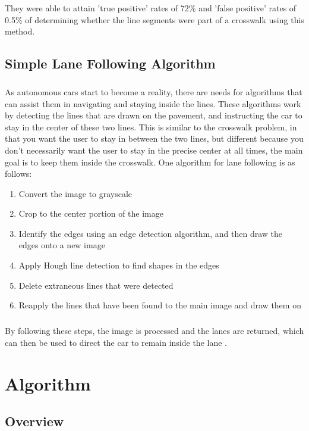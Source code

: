 \documentclass[12pt]{ucthesis}
\begin{document}
They were able to attain 'true positive' rates of 72\% and 'false positive' rates  of 0.5\% of determining whether the line segments were part of a crosswalk using this method. 


\section{Simple Lane Following Algorithm}
\paragraph{}
As autonomous cars start to become a reality, there are needs for algorithms
that can assist them in navigating and staying inside the lines. These
algorithms work by detecting the lines that are drawn on the pavement, and
instructing the car to stay in the center of these two lines. This is similar to
the crosswalk problem, in that you want the user to stay in between the two
lines, but different because you don't necessarily want the user to stay in the
precise center at all times, the main goal is to keep them inside the crosswalk.
One algorithm for lane following is as follows:
\begin{enumerate}
  \item Convert the image to grayscale
  \item Crop to the center portion of the image
  \item Identify the edges using an edge detection algorithm, and then draw the
  edges onto a new image
  \item Apply Hough line detection to find shapes in the edges
  \item Delete extraneous lines that were detected
  \item Reapply the lines that have been found to the main image and draw them
  on
\end{enumerate}
\paragraph{}
By following these steps, the image is processed and the lanes are returned,
which can then be used to direct the car to remain inside the lane \cite{SingleLane1}.


\chapter{Algorithm}
\section{Overview}
\label{Overview}
\end{document}
